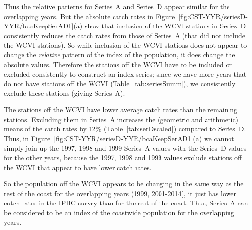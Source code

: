 Thus the relative patterns for Series~A and Series~D appear similar for the
overlapping years. But the absolute catch rates in
Figure~\ref{fig:CST-YYR/seriesD-YYR/bcaKeepSerAD1}(a) show that inclusion of the
WCVI stations in Series~D consistently reduces the catch rates from those of
Series~A (that did not include the WCVI stations). So while inclusion of the
WCVI stations does not appear to change the \emph{relative} pattern of the index
of the population, it does change the absolute values. Therefore the stations
off the WCVI have to be included or excluded consistently to construct an index
series; since we have more years that do not have stations off the WCVI
(Table~\ref{tab:seriesSumm}), we consistently exclude these stations (giving
Series~A).

The stations off the WCVI have lower average catch rates than the remaining
stations. Excluding them in Series~A increases the (geometric and arithmetic)
means of the catch rates by 12\% (Table~\ref{tab:serDscaled}) compared to
Series~D. Thus, in Figure~\ref{fig:CST-YYR/seriesD-YYR/bcaKeepSerAD1}(a) we
cannot simply join up the 1997, 1998 and 1999 Series~A values with the Series~D
values for the other years, because the 1997, 1998 and 1999 values exclude
stations off the WCVI that appear to have lower catch rates.

So the population off the WCVI appears to be changing in the same way as the
rest of the coast for the overlapping years (1999, 2001-2014), it just has lower
catch rates in the IPHC survey than for the rest of the coast. Thus, Series~A
can be considered to be an index of the coastwide population for the overlapping
years.






